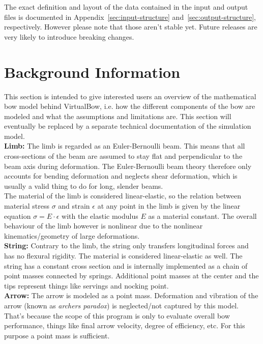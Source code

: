 \documentclass[12pt]{article}
\newcommand{\swtitle}{VirtualBow}
\begin{document}
The exact definition and layout of the data contained in the input and output files is documented in Appendix~\ref{sec:input-structure} and~\ref{sec:output-structure}, respectively. However please note that those aren't stable yet. Future releases are very likely to introduce breaking changes.

\newpage
\section{Background Information}

This section is intended to give interested users an overview of the mathematical bow model behind \swtitle, i.e. how the different components of the bow are modeled and what the assumptions and limitations are.
This section will eventually be replaced by a separate technical documentation of the simulation model.\\

\textbf{Limb:} The limb is regarded as an Euler-Bernoulli beam.
This means that all cross-sections of the beam are assumed to stay flat and perpendicular to the beam axis during deformation.
The Euler-Bernoulli beam theory therefore only accounts for bending deformation and neglects shear deformation, which is usually a valid thing to do for long, slender beams.\\

The material of the limb is considered linear-elastic, so the relation between material stress $\sigma$ and strain $\epsilon$ at any point in the limb is given by the linear equation $\sigma = E\cdot \epsilon$ with the elastic modulus $E$ as a material constant.
The overall behaviour of the limb however is nonlinear due to the nonlinear kinematics/geometry of large deformations.\\

\textbf{String:} Contrary to the limb, the string only transfers longitudinal forces and has no flexural rigidity.
The material is considered linear-elastic as well.
The string has a constant cross section and is internally implemented as a chain of point masses connected by springs.
Additional point masses at the center and the tips represent things like servings and nocking point.\\

\textbf{Arrow:} The arrow is modeled as a point mass.
Deformation and vibration of the arrow (known as \textit{archers paradox}) is neglected/not captured by this model.
That's because the scope of this program is only to evaluate overall bow performance, things like final arrow velocity, degree of efficiency, etc.
For this purpose a point mass is sufficient.\\
\end{document}
